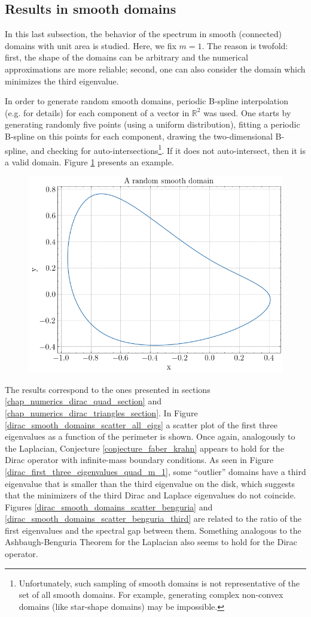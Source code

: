 \subsection{Results in smooth domains}

In this last subsection, the behavior of the spectrum in smooth (connected) domains with unit area is studied. Here, we fix \(m=1\). The reason is twofold: first, the shape of the domains can be arbitrary and the numerical approximations are more reliable; second, one can also consider the domain which minimizes the third eigenvalue.

In order to generate random smooth domains, periodic B-spline interpolation (e.g. \cite{de1978practical} for details) for each component of a vector in \(\mathbb{R}^2\) was used. One starts by generating randomly five points (using a uniform distribution), fitting a periodic B-spline on this points for each component, drawing the two-dimensional B-spline, and checking for auto-intersections\footnote{Unfortunately, such sampling of smooth domains is not representative of the set of all smooth domains. For example, generating complex non-convex domains (like star-shape domains) may be impossible.}. If it does not auto-intersect, then it is a valid domain. Figure \ref{dirac_smooth_random_domain} presents an example.

\begin{figure}[!htb]
    \centering
    \includegraphics[width=0.55\linewidth]{Images/Dirac/smooth/random_smooth_domain.png}
    \label{dirac_smooth_random_domain}
\end{figure}

The results correspond to the ones presented in sections \ref{chap_numerics_dirac_quad_section} and \ref{chap_numerics_dirac_triangles_section}. In Figure \ref{dirac_smooth_domains_scatter_all_eigs} a scatter plot of the first three eigenvalues as a function of the perimeter is shown. Once again, analogously to the Laplacian, Conjecture \ref{conjecture_faber_krahn} appears to hold for the Dirac operator with infinite-mass boundary conditions. As seen in Figure \ref{dirac_first_three_eigenvalues_quad_m_1}, some ``outlier'' domains have a third eigenvalue that is smaller than the third eigenvalue on the disk, which suggests that the minimizers of the third Dirac and Laplace eigenvalues do not coincide.
Figures \ref{dirac_smooth_domains_scatter_benguria} and \ref{dirac_smooth_domains_scatter_benguria_third} are related to the ratio of the first eigenvalues and the spectral gap between them. Something analogous to the Ashbaugh-Benguria Theorem for the Laplacian also seems to hold for the Dirac operator.

